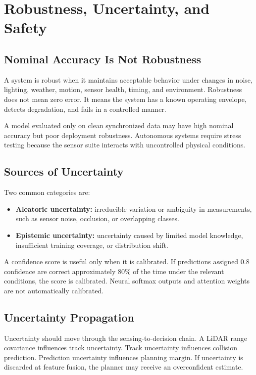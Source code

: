 \chapter{Robustness, Uncertainty, and Safety}
\label{chap:robustness}

\section{Nominal Accuracy Is Not Robustness}

A system is robust when it maintains acceptable behavior under changes in noise, lighting, weather, motion, sensor health, timing, and environment. Robustness does not mean zero error. It means the system has a known operating envelope, detects degradation, and fails in a controlled manner.

A model evaluated only on clean synchronized data may have high nominal accuracy but poor deployment robustness. Autonomous systems require stress testing because the sensor suite interacts with uncontrolled physical conditions.

\section{Sources of Uncertainty}

Two common categories are:

\begin{itemize}
    \item \textbf{Aleatoric uncertainty:} irreducible variation or ambiguity in measurements, such as sensor noise, occlusion, or overlapping classes.
    \item \textbf{Epistemic uncertainty:} uncertainty caused by limited model knowledge, insufficient training coverage, or distribution shift.
\end{itemize}

A confidence score is useful only when it is calibrated. If predictions assigned \(0.8\) confidence are correct approximately \(80\%\) of the time under the relevant conditions, the score is calibrated. Neural softmax outputs and attention weights are not automatically calibrated.

\section{Uncertainty Propagation}

Uncertainty should move through the sensing-to-decision chain. A LiDAR range covariance influences track uncertainty. Track uncertainty influences collision prediction. Prediction uncertainty influences planning margin. If uncertainty is discarded at feature fusion, the planner may receive an overconfident estimate.

